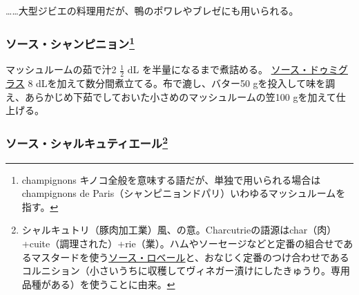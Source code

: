 \begin{recette}
\ldots{}\ldots{}大型ジビエの料理用だが、鴨のポワレやブレゼにも用いられる。

\atoaki{}

\hypertarget{sauce-aux-champignons}{%
\subsubsection[ソース・シャンピニョン]{\texorpdfstring{ソース・シャンピニョン\footnote{champignons
  キノコ全般を意味する語だが、単独で用いられる場合は champignons de
  Paris（シャンピニョンドパリ）いわゆるマッシュルームを指す。}}{ソース・シャンピニョン}}\label{sauce-aux-champignons}}



マッシュルームの茹で汁2 \(\frac{1}{2}\) dL を半量になるまで煮詰める。
\protect\hyperlink{sauce-demi-glace}{ソース・ドゥミグラス} 8
dLを加えて数分間煮立てる。布で漉し、バター50
gを投入して味を調え、あらかじめ下茹でしておいた小さめのマッシュルームの笠100
gを加えて仕上げる。

\atoaki{}

\hypertarget{sauce-charcutiere}{%
\subsubsection[ソース・シャルキュティエール]{\texorpdfstring{ソース・シャルキュティエール\footnote{シャルキュトリ（豚肉加工業）風、の意。Charcutrieの語源はchar（肉）
  +cuite（調理された）+rie（業）。ハムやソーセージなどと定番の組合せであるマスタードを使う\protect\hyperlink{sauce-robert}{ソース・ロベール}と、おなじく定番のつけ合わせであるコルニション（小さいうちに収穫してヴィネガー漬けにしたきゅうり。専用品種がある）を使うことに由来。}}{ソース・シャルキュティエール}}\label{sauce-charcutiere}}




\end{recette}
